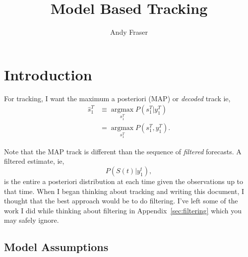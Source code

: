 \documentclass[11pt]{article}
\title{Model Based Tracking}
\author{Andy Fraser}
\newcommand{\ts}[4]{{#1}_{#3}^{#4}} %
\newcommand{\argmax}{\operatorname*{argmax}}
\begin{document}
\maketitle

\section*{Introduction}
\label{sec:introduction}

For tracking, I want the maximum a posteriori (MAP) or \emph{decoded}
track ie,
\begin{align*}
  \ts{\hat s}{\tau}{1}{T} &\equiv \argmax_{\ts{s}{\tau}{1}{T}}
  P(\ts{s}{\tau}{1}{T}|\ts{y}{\tau}{1}{T}) \\
  &= \argmax_{\ts{s}{\tau}{1}{T}} P(\ts{s}{\tau}{1}{T},\ts{y}{\tau}{1}{T}).
\end{align*}

Note that the MAP track is different than the sequence of
\emph{filtered} forecasts.  A filtered estimate, ie,
\begin{equation*}
  P(S(t)|\ts{y}{\tau}{1}{t}),
\end{equation*}
is the entire a posteriori distribution at each time given the
observations up to that time.  When I began thinking about tracking
and writing this document, I thought that the best approach would be
to do filtering.  I've left some of the work I did while thinking
about filtering in Appendix~\ref{sec:filtering} which you may safely
ignore.

\subsection*{Model Assumptions}
\label{sec:model-assumptions}
\end{document}
